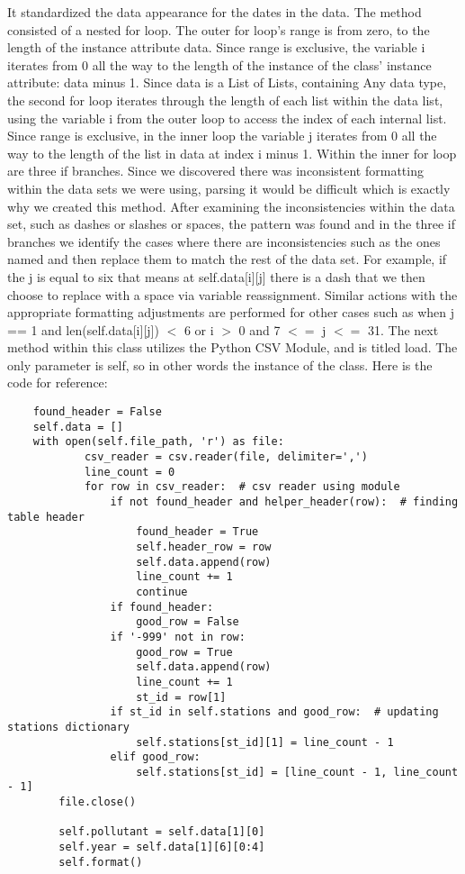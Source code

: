 \documentclass[fontsize=11pt]{article}
\begin{document}
 
 It standardized the data appearance for the dates in the data. The method consisted of a nested for loop. The outer for loop’s range is from zero, to the length of the instance attribute data. Since range is exclusive, the variable i iterates from 0 all the way to the length of the instance of the class' instance attribute: data minus 1. Since data is a List of Lists, containing Any data type, the second for loop iterates through the length of each list within the data list, using the variable i from the outer loop to access the index of each internal list. Since range is exclusive, in the inner loop the variable j  iterates from 0 all the way to the length of the list in data at index i minus 1. Within the inner for loop are three if branches. Since we discovered there was inconsistent formatting within the data sets we were using, parsing it would be difficult which is exactly why we created this method. After examining the inconsistencies within the data set, such as dashes or slashes or spaces, the pattern was found and in the three if branches we identify the cases where there are inconsistencies such as the ones named and then replace them to match the rest of the data set. For example, if the j is equal to six that means at self.data[i][j] there is a dash that we then choose to replace with a space via variable reassignment. Similar actions with the appropriate formatting adjustments are performed for other cases such as when j == 1 and len(self.data[i][j]) $<$ 6 or  i $>$ 0 and 7 $<=$ j $<=$ 31. The next method within this class utilizes the Python CSV Module, and is titled load. The only parameter is self, so in other words the instance of the class. Here is the code for reference: 
 
 \begin{verbatim}
    found_header = False
    self.data = []
    with open(self.file_path, 'r') as file:
            csv_reader = csv.reader(file, delimiter=',')
            line_count = 0
            for row in csv_reader:  # csv reader using module
                if not found_header and helper_header(row):  # finding table header
                    found_header = True
                    self.header_row = row
                    self.data.append(row)
                    line_count += 1
                    continue
                if found_header:
                    good_row = False
                if '-999' not in row:
                    good_row = True
                    self.data.append(row)
                    line_count += 1
                    st_id = row[1]
                if st_id in self.stations and good_row:  # updating stations dictionary
                    self.stations[st_id][1] = line_count - 1
                elif good_row:
                    self.stations[st_id] = [line_count - 1, line_count - 1]
        file.close()

        self.pollutant = self.data[1][0]
        self.year = self.data[1][6][0:4]
        self.format()

 \end{verbatim}
 
\end{document}
